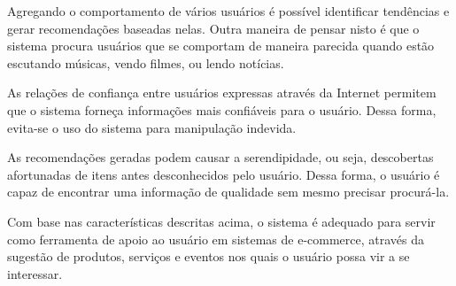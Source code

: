  Agregando o comportamento de vários usuários é possível identificar tendências e gerar recomendações baseadas nelas. Outra maneira de pensar nisto é que o sistema procura usuários que se comportam de maneira parecida quando estão escutando músicas, vendo filmes, ou lendo notícias.
 
 As relações de confiança entre usuários expressas através da Internet permitem que o sistema forneça informações mais confiáveis para o usuário. Dessa forma, evita-se o uso do sistema para manipulação indevida.

 As recomendações geradas podem causar a serendipidade, ou seja, descobertas afortunadas de itens antes desconhecidos pelo usuário. Dessa forma, o usuário é capaz de encontrar uma informação de qualidade sem mesmo precisar procurá-la.

 Com base nas características descritas acima, o sistema é adequado para servir como ferramenta de apoio ao usuário em sistemas de e-commerce, através da sugestão de produtos, serviços e eventos nos quais o usuário possa vir a se interessar.